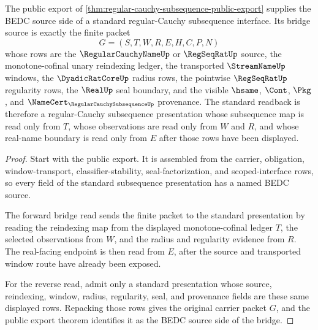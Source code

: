 \begin{theorem}
\label{thm:regular-cauchy-subsequence-standard-bridge-source}
The public export of \autoref{thm:regular-cauchy-subsequence-public-export} supplies the BEDC source side of a standard regular-Cauchy subsequence interface. Its bridge source is exactly the finite packet
$$
G=(S,T,W,R,E,H,C,P,N)
$$
whose rows are the $\RegularCauchyNameUp$ or $\RegSeqRatUp$ source, the monotone-cofinal unary reindexing ledger, the transported $\StreamNameUp$ windows, the $\DyadicRatCoreUp$ radius rows, the pointwise $\RegSeqRatUp$ regularity rows, the $\RealUp$ seal boundary, and the visible $\hsame$, $\Cont$, $\Pkg$, and $\NameCert_{\RegularCauchySubsequenceUp}$ provenance. The standard readback is therefore a regular-Cauchy subsequence presentation whose subsequence map is read only from $T$, whose observations are read only from $W$ and $R$, and whose real-name boundary is read only from $E$ after those rows have been displayed.
\end{theorem}
\begin{proof}
Start with the public export. It is assembled from the carrier, obligation, window-transport, classifier-stability, seal-factorization, and scoped-interface rows, so every field of the standard subsequence presentation has a named BEDC source.

The forward bridge read sends the finite packet to the standard presentation by reading the reindexing map from the displayed monotone-cofinal ledger $T$, the selected observations from $W$, and the radius and regularity evidence from $R$. The real-facing endpoint is then read from $E$, after the source and transported window route have already been exposed.

For the reverse read, admit only a standard presentation whose source, reindexing, window, radius, regularity, seal, and provenance fields are these same displayed rows. Repacking those rows gives the original carrier packet $G$, and the public export theorem identifies it as the BEDC source side of the bridge.
\end{proof}

